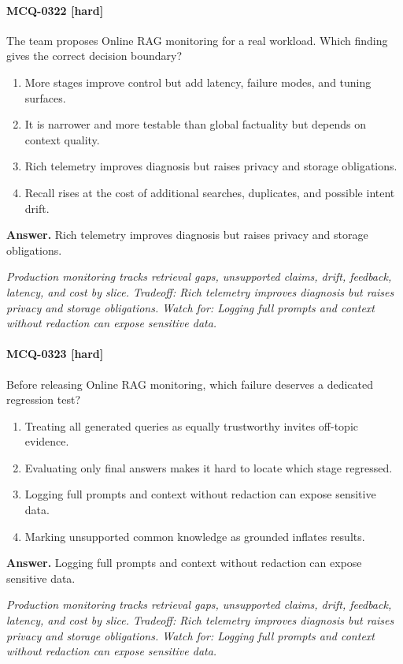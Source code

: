 \paragraph{MCQ-0322 [hard]} The team proposes Online RAG monitoring for a real workload. Which finding gives the correct decision boundary?
\begin{enumerate}[label=\Alph*.]
\item More stages improve control but add latency, failure modes, and tuning surfaces.
\item It is narrower and more testable than global factuality but depends on context quality.
\item Rich telemetry improves diagnosis but raises privacy and storage obligations.
\item Recall rises at the cost of additional searches, duplicates, and possible intent drift.
\end{enumerate}
\noindent\textbf{Answer.} Rich telemetry improves diagnosis but raises privacy and storage obligations.
\par\textit{Production monitoring tracks retrieval gaps, unsupported claims, drift, feedback, latency, and cost by slice. Tradeoff: Rich telemetry improves diagnosis but raises privacy and storage obligations. Watch for: Logging full prompts and context without redaction can expose sensitive data.}
\paragraph{MCQ-0323 [hard]} Before releasing Online RAG monitoring, which failure deserves a dedicated regression test?
\begin{enumerate}[label=\Alph*.]
\item Treating all generated queries as equally trustworthy invites off-topic evidence.
\item Evaluating only final answers makes it hard to locate which stage regressed.
\item Logging full prompts and context without redaction can expose sensitive data.
\item Marking unsupported common knowledge as grounded inflates results.
\end{enumerate}
\noindent\textbf{Answer.} Logging full prompts and context without redaction can expose sensitive data.
\par\textit{Production monitoring tracks retrieval gaps, unsupported claims, drift, feedback, latency, and cost by slice. Tradeoff: Rich telemetry improves diagnosis but raises privacy and storage obligations. Watch for: Logging full prompts and context without redaction can expose sensitive data.}
